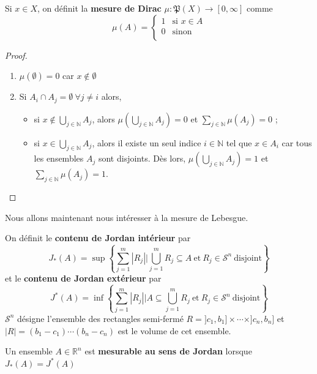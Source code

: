 \begin{example}
    Si $x\in X$, on définit la \textbf{mesure de Dirac} $\mu:\mathfrak{P}(X)\to[0,\infty]$ comme
    \begin{equation*}
        \mu(A) = \left\{\begin{array}{ll}
            1 & \text{si $x\in A$} \\
            0 & \text{sinon}\\
        \end{array}\right.
    \end{equation*}
\end{example}
\begin{proof}
    \begin{enumerate}[label=(\roman*)]
        \item $\mu(\emptyset)=0$ car $x\notin\emptyset$
        \item Si $A_i\cap A_j =\emptyset \ \forall j\neq i$ alors,
        \begin{itemize}
            \item si $x\notin \bigcup_{j\in\mathbb{N}}A_j$, alors $\mu(\bigcup_{j\in\mathbb{N}}A_j) = 0$ et $\sum_{j\in\mathbb{N}}\mu(A_j) = 0$ ;
            \item si $x\in \bigcup_{j\in\mathbb{N}}A_j$, alors il existe un seul indice $i \in\mathbb{N}$ tel que $x\in A_i$ car tous les ensembles $A_j$ sont disjoints. Dès lors, $\mu(\bigcup_{j\in\mathbb{N}}A_j) = 1$ et $\sum_{j\in\mathbb{N}}\mu(A_j) = 1$.
        \end{itemize}
    \end{enumerate}
\end{proof}

Nous allons maintenant nous intéresser à la mesure de Lebesgue.
\begin{definition}
    On définit le \textbf{contenu de Jordan intérieur} par
    \begin{equation*}
        J_*(A) = \sup\left\{\sum_{j=1}^m|R_j| \Big| \bigcup_{j=1}^m R_j \subseteq A \ \text{et}\ R_j\in\mathscr{S}^n\ \text{disjoint}\right\}
    \end{equation*}
    et le \textbf{contenu de Jordan extérieur} par
    \begin{equation*}
        J^*(A) = \inf\left\{\sum_{j=1}^m|R_j| \Big| A \subseteq \bigcup_{j=1}^m R_j \ \text{et}\ R_j\in\mathscr{S}^n\ \text{disjoint}\right\}
    \end{equation*}
    $\mathscr{S}^n$ désigne l'ensemble des rectangles semi-fermé $R = ]c_1,b_1]\times\cdots\times]c_n,b_n]$ et $|R|=(b_1-c_1)\cdots(b_n-c_n)$ est le volume de cet ensemble.
    
    Un ensemble $A\in\mathbb{R}^n$ est \textbf{mesurable au sens de Jordan} lorsque $J_*(A)=J^*(A)$
\end{definition}

